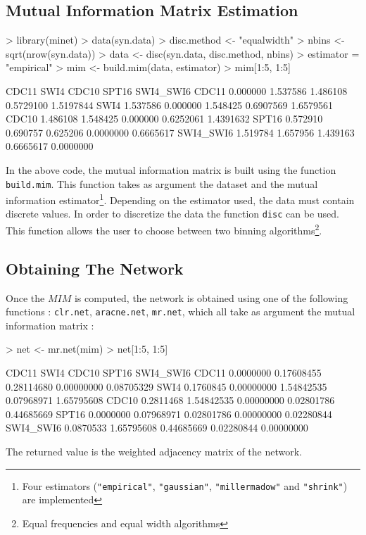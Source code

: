 \documentclass{article}
\newcommand{\Rfunction}[1]{{\texttt{#1}}}
\newcommand{\Robject}[1]{{\texttt{#1}}}
\begin{document}
\subsection{Mutual Information Matrix Estimation}
\begin{Schunk}
\begin{Sinput}
> library(minet)
> data(syn.data)
> disc.method <- "equalwidth"
> nbins <- sqrt(nrow(syn.data))
> data <- disc(syn.data, disc.method, nbins)
> estimator = "empirical"
> mim <- build.mim(data, estimator)
> mim[1:5, 1:5]
\end{Sinput}
\begin{Soutput}
             CDC11     SWI4    CDC10     SPT16 SWI4_SWI6
CDC11     0.000000 1.537586 1.486108 0.5729100 1.5197844
SWI4      1.537586 0.000000 1.548425 0.6907569 1.6579561
CDC10     1.486108 1.548425 0.000000 0.6252061 1.4391632
SPT16     0.572910 0.690757 0.625206 0.0000000 0.6665617
SWI4_SWI6 1.519784 1.657956 1.439163 0.6665617 0.0000000
\end{Soutput}
\end{Schunk}
In the above code, the mutual information matrix is built using the function \Rfunction{build.mim}.
This function takes as argument the dataset and the mutual information estimator\footnote{Four estimators
(\Robject{"empirical"}, \Robject{"gaussian"}, \Robject{"millermadow"} and \Robject{"shrink"}) are implemented}. 
Depending on the estimator used, the data must contain discrete values. In order to discretize the data the function 
{\Rfunction{disc}} can be used. This function allows the user to choose between two binning algorithms\footnote{Equal frequencies and equal width
 algorithms}.
\subsection{Obtaining The Network}
Once the $MIM$ is computed, the network is obtained using one of the following functions : { \Rfunction{clr.net}},
{ \Rfunction{aracne.net}}, { \Rfunction{mr.net}}, which all take as argument the mutual information 
matrix : 

\begin{Schunk}
\begin{Sinput}
> net <- mr.net(mim)
> net[1:5, 1:5]
\end{Sinput}
\begin{Soutput}
              CDC11       SWI4      CDC10      SPT16  SWI4_SWI6
CDC11     0.0000000 0.17608455 0.28114680 0.00000000 0.08705329
SWI4      0.1760845 0.00000000 1.54842535 0.07968971 1.65795608
CDC10     0.2811468 1.54842535 0.00000000 0.02801786 0.44685669
SPT16     0.0000000 0.07968971 0.02801786 0.00000000 0.02280844
SWI4_SWI6 0.0870533 1.65795608 0.44685669 0.02280844 0.00000000
\end{Soutput}
\end{Schunk}
The returned value is the weighted adjacency matrix of the network.
\end{document}
